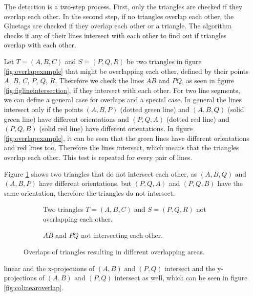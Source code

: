 \documentclass[draft,final]{vutinfth} %
\begin{document}
The detection is a two-step process. First, only the triangles are checked if they overlap each other. In the second step, if no triangles overlap each other, the Gluetags are checked if they overlap each other or a triangle. The algorithm checks if any of their lines intersect with each other to find out if triangles overlap with each other.

Let $T = (A,B,C)$ and $S = (P,Q,R)$ be two triangles in figure \ref{fig:overlapexample} that might be overlapping each other, defined by their points $A$, $B$, $C$, $P$, $Q$, $R$. Therefore we check the lines $\overline{AB}$ and $\overline{PQ}$, as seen in figure \ref{fig:figlineintersection}, if they intersect with each other. For two line segments, we can define a general case for overlaps and a special case. In general the lines intersect only if the points $(A,B,P)$ (dotted green line) and $(A,B,Q)$ (solid green line) have different orientations and $(P,Q,A)$ (dotted red line) and $(P,Q,B)$ (solid red line) have different orientations. In figure \ref{fig:overlapexample}, it can be seen that the green lines have different orientations and red lines too. Therefore the lines intersect, which means that the triangles overlap each other. This test is repeated for every pair of lines.

Figure \ref{fig:nooverlap} shows two triangles that do not intersect each other, as $(A,B,Q)$ and $(A,B,P)$ have different orientations, but $(P,Q,A)$ and $(P,Q,B)$ have the same orientation, therefore the triangles do not intersect.

\begin{figure}
\centering
\begin{subfigure}[t]{.4\textwidth}
	
  \caption{Two triangles $T = (A,B,C)$ and $S = (P,Q,R)$ not overlapping each other.}
\end{subfigure}%
\hspace{.1\textwidth}
\begin{subfigure}[t]{.4\textwidth}
	
	\caption{$\overline{AB}$ and $\overline{PQ}$ not intersecting each other.}
\end{subfigure}
\caption{Overlaps of triangles resulting in different overlapping areas.}
\label{fig:nooverlap}
\end{figure}

linear and the x-projections of $(A,B)$ and $(P,Q)$ intersect and the y-projections of $(A,B)$ and $(P,Q)$ intersect as well, which can be seen in figure \ref{fig:colinearoverlap}.
\end{document}
